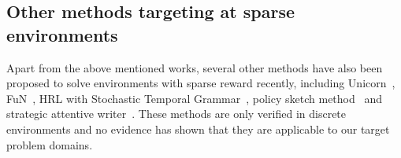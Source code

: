\subsection{Other methods targeting at sparse environments}
Apart from the above mentioned works, several other methods have also been proposed to solve environments with sparse reward recently, including Unicorn~\cite{mankowitz2018unicorn}, FuN~\cite{vezhnevets2017feudal},  HRL with Stochastic Temporal Grammar~\cite{shu2017hierarchical}, policy sketch method~\cite{andreas2016modular} and strategic attentive writer~\cite{vezhnevets2016strategic}. These methods are only verified in discrete environments and no evidence has shown that they are applicable to our target problem domains.